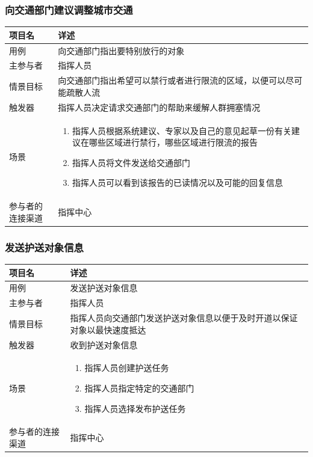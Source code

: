 \documentclass{ctexrep}
\begin{document}
\subsubsection{向交通部门建议调整城市交通}
\begin{longtable}{p{2cm} | p{10cm}}
\hline
项目名 & 详述 \\
\hline
\hline
用例 & 向交通部门指出要特别放行的对象\\
\hline
主参与者 &指挥人员 \\
\hline
情景目标 &  向交通部门指出希望可以禁行或者进行限流的区域，以便可以尽可能疏散人流\\
\hline
触发器 &  指挥人员决定请求交通部门的帮助来缓解人群拥塞情况\\
\hline
场景 & \begin{enumerate}
	\item 指挥人员根据系统建议、专家以及自己的意见起草一份有关建议在哪些区域进行禁行，哪些区域进行限流的报告
	\item 指挥人员将文件发送给交通部门
		\item 指挥人员可以看到该报告的已读情况以及可能的回复信息
\end{enumerate} \\
\hline
参与者的连接渠道 & 指挥中心 \\
\hline
\end{longtable}

\subsubsection{发送护送对象信息}
\begin{longtable}{p{2cm} | p{10cm}}
\hline
项目名 & 详述 \\
\hline
\hline
用例 & 发送护送对象信息\\
\hline
主参与者 & 指挥人员 \\
\hline
情景目标 &  指挥人员向交通部门发送护送对象信息以便于及时开道以保证对象以最快速度抵达\\
\hline
触发器 &  收到护送对象信息\\
\hline
场景 & \begin{enumerate}
	\item 指挥人员创建护送任务
	\item 指挥人员指定特定的交通部门
	\item 指挥人员选择发布护送任务
\end{enumerate} \\
\hline
参与者的连接渠道 & 指挥中心 \\
\hline
\end{longtable}
\end{document}

